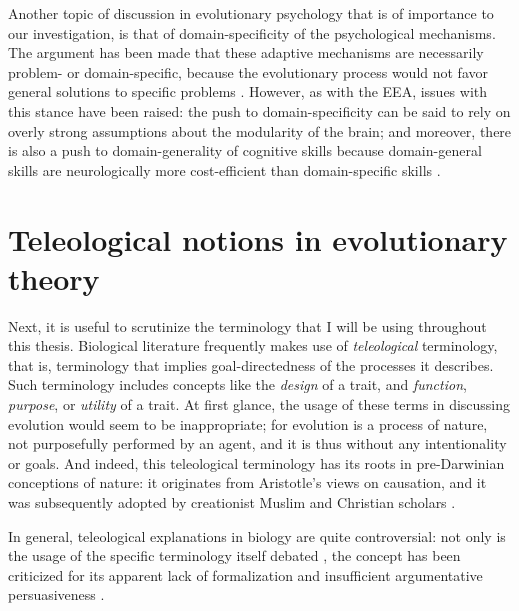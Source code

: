 Another topic of discussion in evolutionary psychology that is of importance to our investigation, is that of domain-specificity of the psychological mechanisms. The argument has been made that these adaptive mechanisms are necessarily problem- or domain-specific, because the evolutionary process would not favor general solutions to specific problems \citep[p.~50]{Buss15}.
However, as with the EEA, issues with this stance have been raised: the push to domain-specificity can be said to rely on overly strong assumptions about the modularity of the brain; and moreover, there is also a push to domain-generality of cognitive skills because domain-general skills are neurologically more cost-efficient than domain-specific skills \citep{LB02}.

\section{Teleological notions in evolutionary theory}
\label{sec:teleology}
Next, it is useful to scrutinize the terminology that I will be using throughout this thesis.
Biological literature frequently makes use of \emph{teleological} terminology, that is, terminology that implies goal-directedness of the processes it describes. Such terminology includes concepts like the \emph{design} of a trait, and \emph{function}, \emph{purpose}, or \emph{utility} of a trait.
At first glance, the usage of these terms in discussing evolution would seem to be inappropriate; for evolution is a process of nature, not purposefully performed by an agent, and it is thus without any intentionality or goals.
And indeed, this teleological terminology has its roots in pre-Darwinian conceptions of nature: it originates from Aristotle's views on causation, and it was subsequently adopted by creationist Muslim and Christian scholars \citep{Johnson05}.

In general, teleological explanations in biology are quite controversial: not only is the usage of the specific terminology itself debated \citep[p.~27 and references therein]{Ayala99}, the concept has been criticized for its apparent lack of formalization and insufficient argumentative persuasiveness \citep[p.~83]{Baedke2021}.


